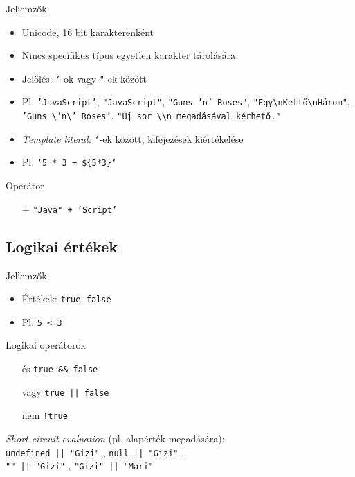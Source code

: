 \documentclass[usenames,dvipsnames,aspectratio=169]{beamer}
\begin{document}
\begin{frame}
    Jellemzők
    \begin{itemize}
        \item Unicode, 16 bit karakterenként
        \item Nincs specifikus típus egyetlen karakter tárolására
        \item Jelölés: \texttt{'}-ok vagy \texttt{"}-ek között
        \item Pl. \texttt{'JavaScript'}, \texttt{"JavaScript"}, \texttt{"Guns 'n' Roses"}, \texttt{"Egy\textbackslash nKettő\textbackslash nHárom"}, \texttt{'Guns \textbackslash 'n\textbackslash' Roses'}, \texttt{"Új sor \textbackslash\textbackslash n megadásával kérhető."}
        \item \emph{Template literal:} \texttt{`}-ek között, kifejezések kiértékelése
        \item Pl. \texttt{`5 * 3 = \$\{5*3\}`} 
    \end{itemize}
    \vfill
    Operátor
    \begin{itemize}
        \item[$+$] \texttt{"Java" + 'Script'} 
    \end{itemize}
\end{frame}

\subsection{Logikai értékek}

\begin{frame}
    Jellemzők
    \begin{itemize}
        \item Értékek: \texttt{true}, \texttt{false}
        \item Pl. \texttt{5 < 3} 
    \end{itemize}
    \vfill
    Logikai operátorok
    \begin{itemize}
        \item[és] \texttt{true \&\& false} 
        \item[vagy] \texttt{true || false} 
        \item[nem] \texttt{!true} 
    \end{itemize}
    \vfill
    \emph{Short circuit evaluation} (pl. alapérték megadására):\\ \qquad \texttt{undefined || "Gizi"} , \texttt{null || "Gizi"} , \\ \qquad \texttt{"" || "Gizi"} , \texttt{"Gizi" || "Mari"} 
\end{frame}
\end{document}
